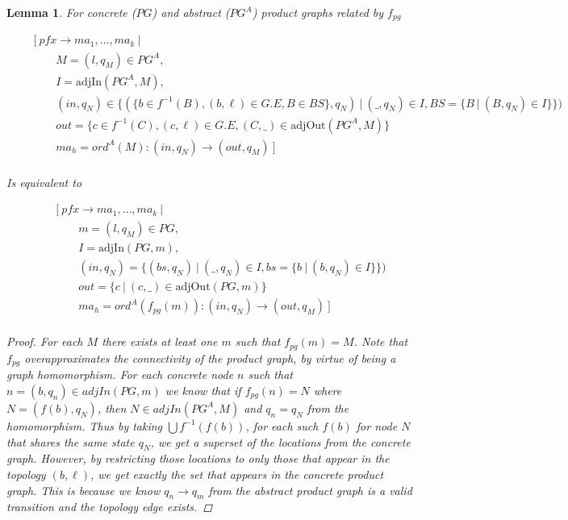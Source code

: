 \documentclass[twocolumn, openany]{sig-alternate-10pt}
\newtheorem{lem}[thm]{Lemma}
\begin{document}
\begin{lem}

  For concrete ($PG$) and abstract ($PG^A$) product graphs related by $f_{pg}$

  \[ \begin{array}{l}
     ~~~~~~~~~ [~ pfx \rightarrow ma_1, \dots, ma_k ~\vert~ \\
     ~~~~~~~~~~~~~~~~~~ M = (l,q_M) \in PG^A, \\
     ~~~~~~~~~~~~~~~~~~ I = \text{adjIn}(PG^A,M), \\
     ~~~~~~~~~~~~~~~~~~ (in,q_N) \in \{(\{b\in f^{-1}(B), (b,\ell) \in G.E, B \in BS\},q_N) ~\vert~ (\_,q_N) \in I, BS=\{B~\vert~ (B,q_N) \in I \} \}) \\
     ~~~~~~~~~~~~~~~~~~ out = \{ c \in f^{-1}(C), (c,\ell) \in G.E, (C,\_) \in \text{adjOut}(PG^A,M) \} \\
     ~~~~~~~~~~~~~~~~~~ ma_h = ord^A(M) : (in,q_N) \rightarrow (out,q_M) ~] \\
  \end{array} \]%

  Is equivalent to

  \[ \begin{array}{l}
     ~~~~~~~~~ [~ pfx \rightarrow ma_1, \dots, ma_k ~\vert~ \\
     ~~~~~~~~~~~~~~~~~~ m = (l,q_M) \in PG, \\
     ~~~~~~~~~~~~~~~~~~ I = \text{adjIn}(PG,m), \\
     ~~~~~~~~~~~~~~~~~~ (in,q_N) = \{ (bs,q_N) ~\vert~ (\_,q_N) \in I, bs=\{ b ~\vert~ (b,q_N) \in I\} \}) \\
     ~~~~~~~~~~~~~~~~~~ out = \{ c ~\vert~ (c,\_) \in \text{adjOut}(PG,m) \} \\
     ~~~~~~~~~~~~~~~~~~ ma_h = ord^A(f_{pg}(m)) : (in,q_N) \rightarrow (out,q_M) ~] \\
  \end{array} \]%

  \begin{proof}
    For each $M$ there exists at least one $m$ such that $f_{pg}(m) = M$. Note that $f_{pg}$ overapproximates the connectivity of the product graph, by virtue of being a graph homomorphism. For each concrete node $n$ such that $n = (b,q_n) \in adjIn(PG,m)$ we know that if $f_{pg}(n) = N$ where $N = (f(b),q_N)$, then $N \in adjIn(PG^A,M)$ and $q_n = q_N$ from the homomorphism. Thus by taking $\bigcup f^{-1}(f(b))$, for each such $f(b)$ for node $N$ that shares the same state $q_N$, we get a superset of the locations from the concrete graph. However, by restricting those locations to only those that appear in the topology $(b,\ell)$, we get exactly the set that appears in the concrete product graph. This is because we know $q_n \rightarrow q_m$ from the abstract product graph is a valid transition and the topology edge exists.
  \end{proof}

\end{lem}
\end{document}
